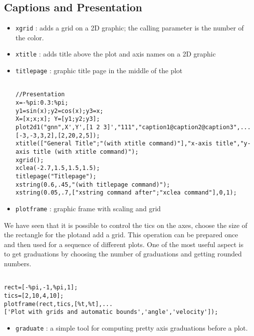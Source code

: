 \subsection{Captions and Presentation}
%
\begin{itemize}
	\item \verb+xgrid+	: adds a grid on a 2D graphic; the
calling parameter is the number of the color.
	\item \verb+xtitle+	: adds	title above the plot and axis 
names on a 2D graphic
	\item \verb+titlepage+	: graphic title page in the middle of
the plot

\begin{verbatim}

//Presentation
x=-%pi:0.3:%pi;
y1=sin(x);y2=cos(x);y3=x;
X=[x;x;x]; Y=[y1;y2;y3];
plot2d1("gnn",X',Y',[1 2 3]',"111","caption1@caption2@caption3",...
[-3,-3,3,2],[2,20,2,5]);
xtitle(["General Title";"(with xtitle command)"],"x-axis title","y-axis title (with xtitle command)");
xgrid();
xclea(-2.7,1.5,1.5,1.5);
titlepage("Titlepage");
xstring(0.6,.45,"(with titlepage command)");
xstring(0.05,.7,["xstring command after";"xclea command"],0,1);

\end{verbatim}



	\item \verb+plotframe+	: graphic frame with scaling and grid
\end{itemize}
%

We have seen that it is possible to control the tics on the axes,
choose the size of the rectangle for the plotand add a grid.
This operation can be prepared once and then used for a sequence of
different plots. One of the most useful aspect is to get  graduations 
by choosing the number of graduations and getting rounded numbers.

\begin{verbatim}

rect=[-%pi,-1,%pi,1];
tics=[2,10,4,10];
plotframe(rect,tics,[%t,%t],...
['Plot with grids and automatic bounds','angle','velocity']);

\end{verbatim}

\begin{itemize}
	\item \verb+graduate+	: a simple tool for computing pretty
axis graduations before a plot.
\end{itemize}
%

